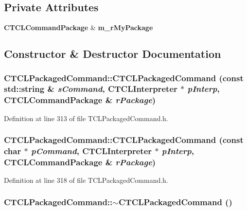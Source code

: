 \subsection*{Private Attributes}
\begin{CompactItemize}
\item 
{\bf CTCLCommand\-Package} \& {\bf m\_\-r\-My\-Package}
\end{CompactItemize}


\subsection{Constructor \& Destructor Documentation}
\subsubsection{\setlength{\rightskip}{0pt plus 5cm}CTCLPackaged\-Command::CTCLPackaged\-Command (const std::string \& {\em s\-Command}, {\bf CTCLInterpreter} $\ast$ {\em p\-Interp}, {\bf CTCLCommand\-Package} \& {\em r\-Package})\hspace{0.3cm}{\tt  [inline]}}\label{classCTCLPackagedCommand_a0}




Definition at line 313 of file TCLPackaged\-Command.h.
\subsubsection{\setlength{\rightskip}{0pt plus 5cm}CTCLPackaged\-Command::CTCLPackaged\-Command (const char $\ast$ {\em p\-Command}, {\bf CTCLInterpreter} $\ast$ {\em p\-Interp}, {\bf CTCLCommand\-Package} \& {\em r\-Package})\hspace{0.3cm}{\tt  [inline]}}\label{classCTCLPackagedCommand_a1}




Definition at line 318 of file TCLPackaged\-Command.h.
\subsubsection{\setlength{\rightskip}{0pt plus 5cm}CTCLPackaged\-Command::$\sim$CTCLPackaged\-Command ()\hspace{0.3cm}{\tt  [inline]}}\label{classCTCLPackagedCommand_a2}





